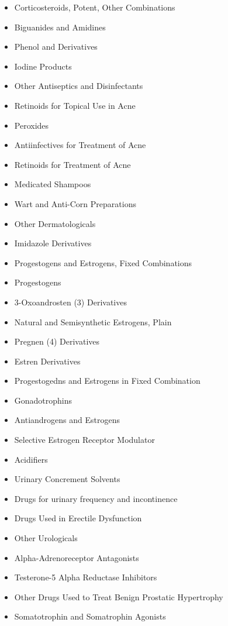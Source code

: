 \documentclass[a4paper,12pt]{article}
\begin{document}
\begin{appendices}
\begin{itemize}
   			\item Corticosteroids, Potent, Other Combinations
   			\item Biguanides and Amidines
   			\item Phenol and Derivatives
   			\item Iodine Products
   			\item Other Antiseptics and Disinfectants
   			\item Retinoids for Topical Use in Acne
   			\item Peroxides
   			\item Antiinfectives for Treatment of Acne
   			\item Retinoids for Treatment of Acne
   			\item Medicated Shampoos
   			\item Wart and Anti-Corn Preparations
   			\item Other Dermatologicals
   			\item Imidazole Derivatives
   			\item Progestogens and Estrogens, Fixed Combinations
   			\item Progestogens
   			\item 3-Oxoandrosten (3) Derivatives
   			\item Natural and Semisynthetic Estrogens, Plain
   			\item Pregnen (4) Derivatives
   			\item Estren Derivatives
   			\item Progestogedns and Estrogens in Fixed Combination
   			\item Gonadotrophins
   			\item Antiandrogens and Estrogens
   			\item Selective Estrogen Receptor Modulator
   			\item Acidifiers
   			\item Urinary Concrement Solvents
   			\item Drugs for urinary frequency and incontinence
   			\item Drugs Used in Erectile Dysfunction
   			\item Other Urologicals
   			\item Alpha-Adrenoreceptor Antagonists
   			\item Testerone-5 Alpha Reductase Inhibitors
   			\item Other Drugs Used to Treat Benign Prostatic Hypertrophy
   			\item Somatotrophin and Somatrophin Agonists

\end{itemize}
\end{appendices}
\end{document}
